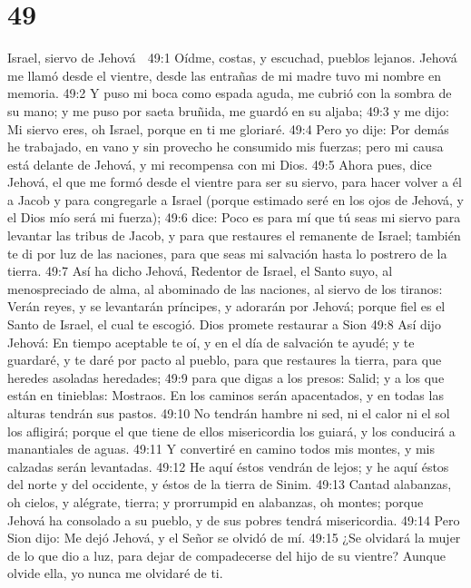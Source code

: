 \chapter{49}

Israel, siervo de Jehová  

49:1 Oídme, costas, y escuchad, pueblos lejanos. Jehová me llamó desde el vientre, desde las entrañas de mi madre tuvo mi nombre en memoria.  
49:2 Y puso mi boca como espada aguda, me cubrió con la sombra de su mano; y me puso por saeta bruñida, me guardó en su aljaba;  
49:3 y me dijo: Mi siervo eres, oh Israel, porque en ti me gloriaré.  
49:4 Pero yo dije: Por demás he trabajado, en vano y sin provecho he consumido mis fuerzas; pero mi causa está delante de Jehová, y mi recompensa con mi Dios.  
49:5 Ahora pues, dice Jehová, el que me formó desde el vientre para ser su siervo, para hacer volver a él a Jacob y para congregarle a Israel (porque estimado seré en los ojos de Jehová, y el Dios mío será mi fuerza);  
49:6 dice: Poco es para mí que tú seas mi siervo para levantar las tribus de Jacob, y para que restaures el remanente de Israel; también te di por luz de las naciones, para que seas mi salvación hasta lo postrero de la tierra. 
49:7 Así ha dicho Jehová, Redentor de Israel, el Santo suyo, al menospreciado de alma, al abominado de las naciones, al siervo de los tiranos: Verán reyes, y se levantarán príncipes, y adorarán por Jehová; porque fiel es el Santo de Israel, el cual te escogió.  
Dios promete restaurar a Sion  
49:8 Así dijo Jehová: En tiempo aceptable te oí, y en el día de salvación te ayudé; y te guardaré, y te daré por pacto al pueblo, para que restaures la tierra, para que heredes asoladas heredades;  
49:9 para que digas a los presos: Salid; y a los que están en tinieblas: Mostraos. En los caminos serán apacentados, y en todas las alturas tendrán sus pastos.  
49:10 No tendrán hambre ni sed, ni el calor ni el sol los afligirá; porque el que tiene de ellos misericordia los guiará, y los conducirá a manantiales de aguas. 
49:11 Y convertiré en camino todos mis montes, y mis calzadas serán levantadas.  
49:12 He aquí éstos vendrán de lejos; y he aquí éstos del norte y del occidente, y éstos de la tierra de Sinim.  
49:13 Cantad alabanzas, oh cielos, y alégrate, tierra; y prorrumpid en alabanzas, oh montes; porque Jehová ha consolado a su pueblo, y de sus pobres tendrá misericordia.  
49:14 Pero Sion dijo: Me dejó Jehová, y el Señor se olvidó de mí.  
49:15 ¿Se olvidará la mujer de lo que dio a luz, para dejar de compadecerse del hijo de su vientre? Aunque olvide ella, yo nunca me olvidaré de ti.  
